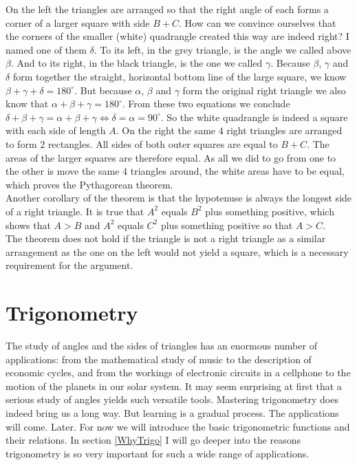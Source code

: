 \noindent On the left the triangles are arranged so that the right angle of each forms a corner of a larger square with side $B+C$. How can we convince ourselves that the corners of the smaller (white) quadrangle created this way are indeed right? I named one of them $\delta$. To its left, in the grey triangle, is the angle we called above $\beta$. And to its right, in the black triangle, is the one we called $\gamma$. Because $\beta$, $\gamma$ and $\delta$ form together the straight, horizontal bottom line of the large square, we know $\beta + \gamma + \delta = 180^{\circ}$. But because $\alpha$, $\beta$ and $\gamma$ form the original right triangle we also know that $\alpha + \beta + \gamma = 180^{\circ}$. From these two equations we conclude $\delta + \beta + \gamma = \alpha + \beta + \gamma \Leftrightarrow \delta = \alpha = 90^{\circ}$. So the white quadrangle is indeed a square with each side of length $A$. On the right the same $4$ right triangles are arranged to form $2$ rectangles. All sides of both outer squares are equal to $B+C$. The areas of the larger squares are therefore equal. As all we did to go from one to the other is move the same $4$ triangles around, the white areas have to be equal, which proves the Pythagorean theorem.\\

\noindent Another corollary of the theorem is that the hypotenuse is always the longest side of a right triangle. It is true that $A^2$ equals $B^2$ plus something positive, which shows that $A>B$ and $A^2$ equals $C^2$ plus something positive so that $A > C$.\\

\noindent The theorem does not hold if the triangle is not a right triangle as a similar arrangement as the one on the left would not yield a square, which is a necessary requirement for the argument.

\section{Trigonometry}

\noindent The study of angles and the sides of triangles has an enormous number of applications: from the mathematical study of music to the description of economic cycles, and from the workings of electronic circuits in a cellphone to the motion of the planets in our solar system. It may seem surprising at first that a serious study of angles yields such versatile tools. Mastering trigonometry does indeed bring us a long way. But learning is a gradual process. The applications will come. Later. For now we will introduce the basic trigonometric functions and their relations. In section \ref{WhyTrigo} I will go deeper into the reasons trigonometry is so very important for such a wide range of applications.

